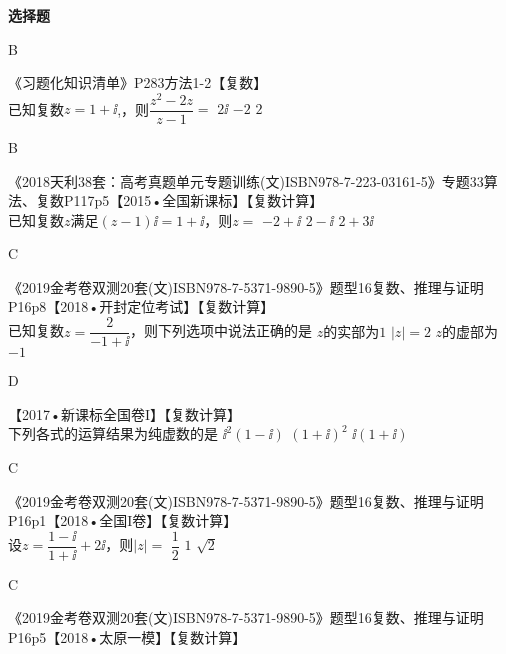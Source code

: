 \begin{exercise}{\bf 选择题}
        \begin{answer}
          B
        \end{answer}
    \item 《习题化知识清单》P283方法1-2【复数】\\
      已知复数$z=1+\ii$,，则$\dfrac{z^2-2z}{z-1}=$\xz
      \xx{$-2\ii$}
       {$2\ii$}
       {$-2$}
       {$2$}
      \begin{answer}
        B
      \end{answer}
    \item 《2018天利38套：高考真题单元专题训练(文)ISBN978-7-223-03161-5》专题33算法、复数P117p5【2015•全国新课标】【复数计算】\\
      已知复数$z$满足$(z-1)\ii=1+\ii$，则$z=$\xz
       {$-2+\ii$}
       {$2-\ii$}
       {$2+3\ii$}
      \begin{answer}
        C
      \end{answer}
    \item 《2019金考卷双测20套(文)ISBN978-7-5371-9890-5》题型16复数、推理与证明P16p8【2018•开封定位考试】【复数计算】\\
        已知复数$z=\dfrac{2}{-1+\ii}$，则下列选项中说法正确的是\xz
         {$z$的实部为$1$}
         {$|z|=2$}
         {$z$的虚部为$-1$}
        \begin{answer}
          D
        \end{answer}
    \item 【2017•新课标全国卷I】【复数计算】\\
      下列各式的运算结果为纯虚数的是\xz
       {$\ii^2(1-\ii)$}
       {$(1+\ii)^2$}
       {$\ii(1+\ii)$}
      \begin{answer}
        C
      \end{answer}
    \item 《2019金考卷双测20套(文)ISBN978-7-5371-9890-5》题型16复数、推理与证明P16p1【2018•全国I卷】【复数计算】\\
      设$z=\dfrac{1-\ii}{1+\ii}+2\ii$，则$|z|=$\xz
       {$\dfrac12$}
       {$1$}
       {$\sqrt2$}
      \begin{answer}
        C
      \end{answer}
    \item 《2019金考卷双测20套(文)ISBN978-7-5371-9890-5》题型16复数、推理与证明P16p5【2018•太原一模】【复数计算】\\

\end{exercise}
